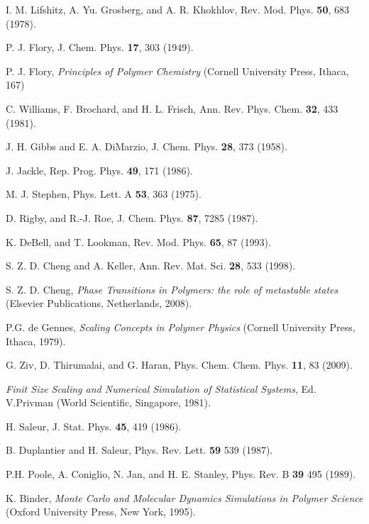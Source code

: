 \documentclass[preprint,preprintnumbers,amsmath,amssymb,showpacs,aps,pre]{revtex4-1}
\begin{document}
\begin{thebibliography}{10}

I. M. Lifshitz, A. Yu. Grosberg, and A. R. Khokhlov, Rev. Mod. Phys.
{\bf 50}, 683 (1978).

P. J. Flory, J. Chem. Phys. {\bf 17}, 303 (1949).

P. J. Flory, {\it Principles of Polymer Chemistry} (Cornell University
Press, Ithaca, 167)

C. Williams, F. Brochard, and H. L. Frisch, Ann. Rev. Phys. Chem.
{\bf 32}, 433 (1981).

J. H. Gibbs and E. A. DiMarzio, J. Chem. Phys. {\bf 28}, 373 (1958).

J. Jackle, Rep. Prog. Phys. {\bf 49}, 171 (1986).

M. J. Stephen, Phys. Lett. A {\bf 53}, 363 (1975).

D. Rigby, and R.-J. Roe, J. Chem. Phys. {\bf 87}, 7285 (1987).

K. DeBell, and T. Lookman, Rev. Mod. Phys. {\bf 65}, 87 (1993).

S. Z. D. Cheng and A. Keller, Ann. Rev. Mat. Sci. {\bf 28}, 533 (1998).

S. Z. D. Cheng, {\it Phase Transitions in Polymers: the role of
metastable states} (Elsevier Publications, Netherlands, 2008).

P.G. de Gennes, {\it Scaling Concepts in Polymer Physics} (Cornell
University Press, Ithaca, 1979).

G. Ziv, D. Thirumalai, and G. Haran, Phys. Chem. Chem. Phys. {\bf 11},
83 (2009).

{\it Finit Size Scaling and Numerical Simulation of Statistical Systems},
Ed. V.Privman (World Scientific, Singapore, 1981).

H. Saleur, J. Stat. Phys. {\bf 45}, 419 (1986).

B. Duplantier and H. Saleur, Phys. Rev. Lett. {\bf 59} 539 (1987).

P.H. Poole, A. Coniglio, N. Jan, and H. E. Stanley, Phys. Rev. B
{\bf 39} 495 (1989).

K. Binder, {\it Monte Carlo and Molecular Dynamics Simulations in
Polymer Science} (Oxford University Press, New York, 1995).


\end{thebibliography}
\end{document}
